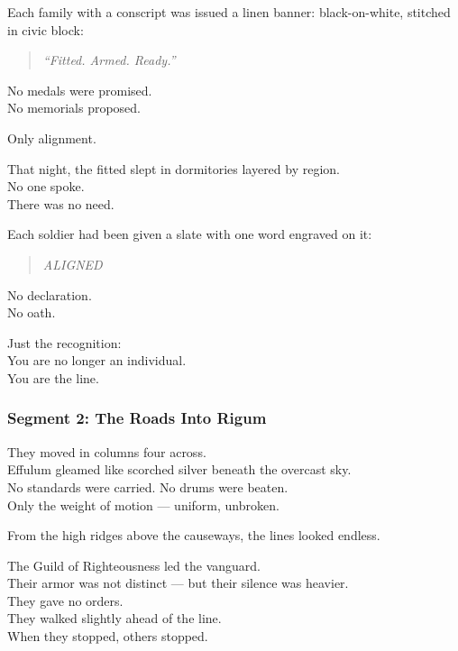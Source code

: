 \documentclass[9pt]{article}
\begin{document}
Each family with a conscript was issued a linen banner: black-on-white, stitched in civic block:

\begin{quote}
\textit{“Fitted. Armed. Ready.”}
\end{quote}

No medals were promised.\\
No memorials proposed.

Only alignment.

\vspace{1em}

That night, the fitted slept in dormitories layered by region.\\
No one spoke.\\
There was no need.

Each soldier had been given a slate with one word engraved on it:

\begin{quote}
\textit{ALIGNED}
\end{quote}

No declaration.\\
No oath.

Just the recognition:\\
You are no longer an individual.\\
You are the line.

\newpage

\subsubsection*{Segment 2: The Roads Into Rigum}

They moved in columns four across.\\
Effulum gleamed like scorched silver beneath the overcast sky.\\
No standards were carried. No drums were beaten.\\
Only the weight of motion — uniform, unbroken.

From the high ridges above the causeways, the lines looked endless.

\vspace{1em}

The Guild of Righteousness led the vanguard.\\
Their armor was not distinct — but their silence was heavier.\\
They gave no orders.\\
They walked slightly ahead of the line.\\
When they stopped, others stopped.
\end{document}
